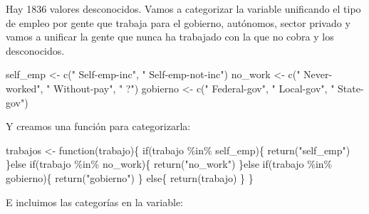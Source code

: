 \documentclass[]{article}
\newenvironment{Shaded}{\begin{snugshade}}{\end{snugshade}}
\newcommand{\ControlFlowTok}[1]{\textcolor[rgb]{0.94,0.87,0.69}{#1}}
\newcommand{\KeywordTok}[1]{\textcolor[rgb]{0.94,0.87,0.69}{#1}}
\newcommand{\NormalTok}[1]{\textcolor[rgb]{0.80,0.80,0.80}{#1}}
\newcommand{\OperatorTok}[1]{\textcolor[rgb]{0.94,0.94,0.82}{#1}}
\newcommand{\StringTok}[1]{\textcolor[rgb]{0.80,0.58,0.58}{#1}}
\begin{document}
Hay 1836 valores desconocidos. Vamos a categorizar la variable
unificando el tipo de empleo por gente que trabaja para el gobierno,
autónomos, sector privado y vamos a unificar la gente que nunca ha
trabajado con la que no cobra y los desconocidos.

\begin{Shaded}
\begin{Highlighting}[]
\NormalTok{self\_emp \textless{}{-}}\StringTok{ }\KeywordTok{c}\NormalTok{(}\StringTok{" Self{-}emp{-}inc"}\NormalTok{, }\StringTok{" Self{-}emp{-}not{-}inc"}\NormalTok{)}
\NormalTok{no\_work \textless{}{-}}\StringTok{ }\KeywordTok{c}\NormalTok{(}\StringTok{" Never{-}worked"}\NormalTok{, }\StringTok{" Without{-}pay"}\NormalTok{, }\StringTok{" ?"}\NormalTok{)}
\NormalTok{gobierno \textless{}{-}}\StringTok{ }\KeywordTok{c}\NormalTok{(}\StringTok{" Federal{-}gov"}\NormalTok{, }\StringTok{" Local{-}gov"}\NormalTok{, }\StringTok{" State{-}gov"}\NormalTok{)}
\end{Highlighting}
\end{Shaded}

Y creamos una función para categorizarla:

\begin{Shaded}
\begin{Highlighting}[]
\NormalTok{trabajos \textless{}{-}}\StringTok{ }\ControlFlowTok{function}\NormalTok{(trabajo)\{}
  \ControlFlowTok{if}\NormalTok{(trabajo }\OperatorTok{\%in\%}\StringTok{ }\NormalTok{self\_emp)\{}
    \KeywordTok{return}\NormalTok{(}\StringTok{"self\_emp"}\NormalTok{)}
\NormalTok{  \}}\ControlFlowTok{else} \ControlFlowTok{if}\NormalTok{(trabajo }\OperatorTok{\%in\%}\StringTok{ }\NormalTok{no\_work)\{}
    \KeywordTok{return}\NormalTok{(}\StringTok{"no\_work"}\NormalTok{)}
\NormalTok{  \}}\ControlFlowTok{else} \ControlFlowTok{if}\NormalTok{(trabajo }\OperatorTok{\%in\%}\StringTok{ }\NormalTok{gobierno)\{}
    \KeywordTok{return}\NormalTok{(}\StringTok{"gobierno"}\NormalTok{)}
\NormalTok{  \} }\ControlFlowTok{else}\NormalTok{\{}
    \KeywordTok{return}\NormalTok{(trabajo)}
\NormalTok{  \}}
\NormalTok{\}}
\end{Highlighting}
\end{Shaded}

E incluimos las categorías en la variable:

\begin{Shaded}
\end{Shaded}
\end{document}
